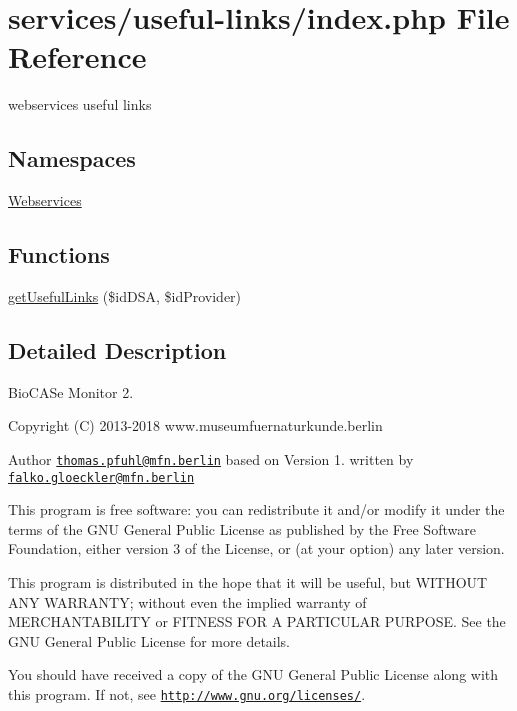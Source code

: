 \hypertarget{services_2useful-links_2index_8php}{}\section{services/useful-\/links/index.php File Reference}
\label{services_2useful-links_2index_8php}


webservices useful links  


\subsection*{Namespaces}
\begin{DoxyCompactItemize}
\item 
 \hyperlink{namespace_webservices}{Webservices}
\end{DoxyCompactItemize}
\subsection*{Functions}
\begin{DoxyCompactItemize}
\item 
\hyperlink{namespace_webservices_ae993bcd484dd56a7995b75671c97c0ba}{get\+Useful\+Links} (\$id\+D\+SA, \$id\+Provider)
\end{DoxyCompactItemize}


\subsection{Detailed Description}
Bio\+C\+A\+Se Monitor 2. \begin{DoxyCopyright}{Copyright}
(C) 2013-\/2018 www.\+museumfuernaturkunde.\+berlin 
\end{DoxyCopyright}
\begin{DoxyAuthor}{Author}
\href{mailto:thomas.pfuhl@mfn.berlin}{\tt thomas.\+pfuhl@mfn.\+berlin} based on Version 1. written by \href{mailto:falko.gloeckler@mfn.berlin}{\tt falko.\+gloeckler@mfn.\+berlin}
\end{DoxyAuthor}
This program is free software\+: you can redistribute it and/or modify it under the terms of the G\+NU General Public License as published by the Free Software Foundation, either version 3 of the License, or (at your option) any later version.

This program is distributed in the hope that it will be useful, but W\+I\+T\+H\+O\+UT A\+NY W\+A\+R\+R\+A\+N\+TY; without even the implied warranty of M\+E\+R\+C\+H\+A\+N\+T\+A\+B\+I\+L\+I\+TY or F\+I\+T\+N\+E\+SS F\+OR A P\+A\+R\+T\+I\+C\+U\+L\+AR P\+U\+R\+P\+O\+SE. See the G\+NU General Public License for more details.

You should have received a copy of the G\+NU General Public License along with this program. If not, see \href{http://www.gnu.org/licenses/}{\tt http\+://www.\+gnu.\+org/licenses/}. 
